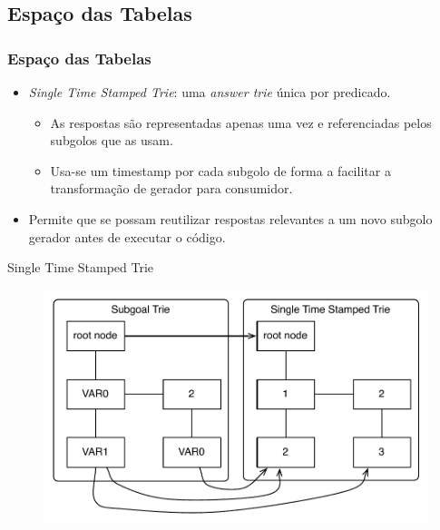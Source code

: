 \documentclass{beamer}
\begin{document}
\subsection{Espaço das Tabelas}
\begin{frame}
   \frametitle{Espaço das Tabelas}
   \begin{itemize}
      \item \emph{Single Time Stamped Trie}: uma \emph{answer trie} única por predicado.
      \begin{itemize}
         \item As respostas são representadas apenas uma vez e referenciadas pelos subgolos que as usam.
         \item Usa-se um timestamp por cada subgolo de forma a facilitar a transformação de gerador para consumidor.
      \end{itemize}
      \item<2-> Permite que se possam reutilizar respostas relevantes a um novo subgolo gerador antes de executar
      o código.
   \end{itemize}
   \begin{block}{Single Time Stamped Trie}
     \begin{figure}[ht]
       \centering
         \includegraphics[scale=0.37]{stst.pdf}
     \end{figure}
   \end{block}
\end{frame}
\end{document}

